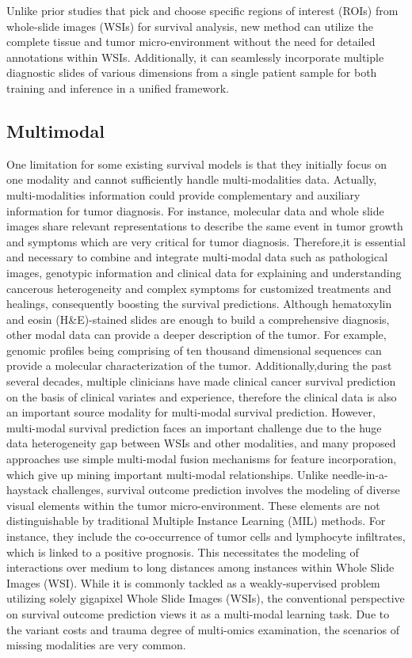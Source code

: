\documentclass[journal,twoside,web]{ieeecolor}
\begin{document}
Unlike prior studies that pick and choose specific regions of interest (ROIs) from whole-slide images (WSIs) for survival analysis, new method can utilize the complete tissue and tumor micro-environment without the need for detailed annotations within WSIs. Additionally, it can seamlessly incorporate multiple diagnostic slides of various dimensions from a single patient sample for both training and inference in a unified framework.

\subsection{Multimodal}
One limitation for some existing survival models is that they initially focus on one modality and cannot sufficiently handle multi-modalities data. 
Actually, multi-modalities information could provide complementary and auxiliary information for tumor diagnosis.
For instance, molecular data and whole slide images share relevant representations to describe the same event in tumor growth and symptoms which are very critical for tumor diagnosis.
Therefore,it is essential and necessary to combine and integrate multi-modal data such as pathological images, genotypic information and clinical data for explaining and understanding cancerous heterogeneity and complex symptoms for customized treatments and healings, consequently boosting the survival predictions.
Although hematoxylin and eosin (H\&E)-stained slides are enough to build a comprehensive diagnosis, other modal data can provide a deeper description of the tumor. For example, genomic profiles being comprising of ten thousand dimensional sequences can provide a molecular characterization of the tumor.
Additionally,during the past several decades, multiple clinicians have made clinical cancer survival prediction on the basis of clinical variates and experience, therefore the clinical data is also an important source modality for multi-modal survival prediction.
However, multi-modal survival prediction faces an important challenge due to the huge data heterogeneity gap between WSIs and other modalities, and many proposed approaches use simple multi-modal fusion mechanisms for feature incorporation, which give up mining important multi-modal relationships.
Unlike needle-in-a-haystack challenges, survival outcome prediction involves the modeling of diverse visual elements within the tumor micro-environment. 
These elements are not distinguishable by traditional Multiple Instance Learning (MIL) methods. 
For instance, they include the co-occurrence of tumor cells and lymphocyte infiltrates, which is linked to a positive prognosis. 
This necessitates the modeling of interactions over medium to long distances among instances within Whole Slide Images (WSI).
While it is commonly tackled as a weakly-supervised problem utilizing solely gigapixel Whole Slide Images (WSIs), the conventional perspective on survival outcome prediction views it as a multi-modal learning task.
Due to the variant costs and trauma degree of multi-omics examination, the scenarios of missing modalities are very common.  
\end{document}
